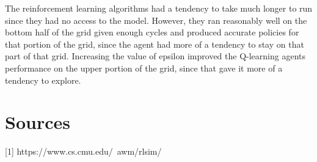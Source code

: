 \documentclass[11pt]{article}
\begin{document}
            The reinforcement learning algorithms had a tendency to take much longer
            to run since they had no access to the model. However, they ran reasonably
            well on the bottom half of the grid given enough cycles and produced accurate
            policies for that portion of the grid, since the agent had more of a tendency
            to stay on that part of that grid. Increasing the value of epsilon improved
            the Q-learning agents performance on the upper portion of the grid, since that
            gave it more of a tendency to explore.

        \section{Sources}
        
        [1] https://www.cs.cmu.edu/~awm/rlsim/

    
\end{document}
